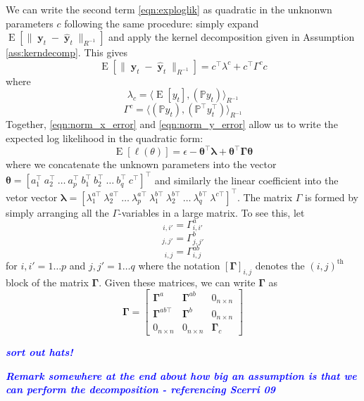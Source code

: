 \documentclass{IEEEtran}
\newcommand{\todo}[1]{\textsf{\emph{\textbf{\textcolor{blue}{#1}}}}}
\newcommand{\inner}[3]{\langle#1,#2\rangle_{#3}}
\newcommand{\dist}[2]{\|#1\|_{#2}}
\DeclareMathOperator{\E}{E}
\DeclareMathOperator{\yvec}{\mathbf{y}}
\begin{document}
We can write the second term \ref{eqn:exploglik} as quadratic in the unknonwn parameters $c$ following the same procedure: simply expand $\E[\dist{\yvec_t-\hat{\yvec}_t}{R^{-1}}]$ and apply the kernel decomposition given in Assumption \ref{ass:kerndecomp}. This gives
\begin{equation}
	\label{eqn:norm_y_error}
	\E[\dist{\yvec_t-\hat{\yvec}_t}{R^{-1}}] = c^\top \lambda^c + c^\top \Gamma^c c
\end{equation}
where
\begin{equation}
	\lambda_c = \inner
	{\E[y_t]}
	{(\mathbb{P} y_t)}
	{R^{-1}}
\end{equation}
\begin{equation}
	 \Gamma^c = \inner
		{(\mathbb{P} y_t)}
		{(\mathbb{P}^\top y_t^\top)}
		{R^{-1}}
\end{equation}
Together, \ref{eqn:norm_x_error} and \ref{eqn:norm_y_error} allow us to write the expected log likelihood in the quadratic form:
\begin{equation}
	\E[\ell(\theta)] = \epsilon - \boldsymbol{\theta}^\top \boldsymbol{\lambda} + \boldsymbol{\theta}^\top \boldsymbol{\Gamma} \boldsymbol{\theta}
\end{equation}
where we concatenate the unknown parameters into the vector $\boldsymbol{\theta} = [a_1^\top ~ a_2^\top ~ \ldots ~ a_p^\top ~ b_1^\top ~ b_2^\top ~ \ldots ~ b_q^\top ~ c^\top]^\top$ and similarly the linear coefficient into the vetor vector $\boldsymbol{\lambda} = [\lambda^{a\top}_1 ~ \lambda^{a\top}_2 ~ \ldots ~ \lambda^{a\top}_p ~ \lambda^{b\top}_1 ~ \lambda^{b\top}_2 ~ \ldots ~ \lambda^{b\top}_q ~ \lambda^{c\top}]^\top$. The matrix $\Gamma$ is formed by simply arranging all the $\Gamma$-variables in a large matrix. To see this, let 
\begin{equation}
	[\boldsymbol{\Gamma}^a]_{i,i'} = \Gamma_{i,i'}^a 
\end{equation}
\begin{equation}
	[\boldsymbol{\Gamma}^b]_{j,j'} = \Gamma_{j,j'}^b 
\end{equation}
\begin{equation}
	[\boldsymbol{\Gamma}^{ab}]_{i,j} = \Gamma_{i,j}^{ab}
\end{equation}
for $i,i' = 1 \ldots p$ and $j,j' = 1 \ldots q$ where the notation $[\boldsymbol{\Gamma}]_{i,j}$ denotes the $(i,j)^\mathrm{th}$ block of the matrix $\boldsymbol{\Gamma}$. Given these matrices, we can write $\boldsymbol{\Gamma}$ as 
\begin{equation}
	\boldsymbol{\Gamma} = \begin{bmatrix}
		\boldsymbol{\Gamma}^a & \boldsymbol{\Gamma}^{ab} & 0_{n\times n} \\
		\boldsymbol{\Gamma}^{ab\top} & \boldsymbol{\Gamma}^{b} & 0_{n\times n} \\
		0_{n\times n} & 0_{n\times n} & \boldsymbol{\Gamma}_c
	\end{bmatrix}
\end{equation}

\todo{sort out hats!}

\newpage

\todo{Remark somewhere at the end about how big an assumption is that we can perform the decomposition - referencing Scerri 09}
\end{document}
